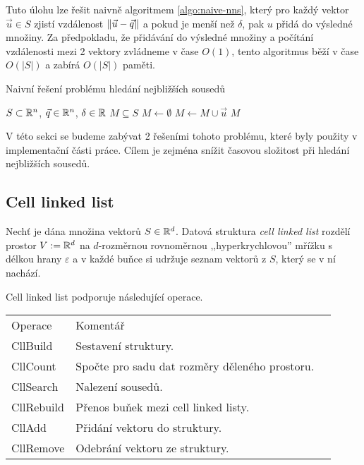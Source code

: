 Tuto úlohu lze řešit naivně algoritmem \ref{algo:naive-nns}, který pro každý vektor $\vec{u} \in S$ zjistí vzdálenost $\|\vec{u} - \vec{q}\|$ a pokud je menší než $\delta$, pak $u$ přidá do výsledné množiny. Za předpokladu, že přidávání do výsledné množiny a počítání vzdálenosti mezi 2 vektory zvládneme v čase $O(1)$, tento algoritmus běží v čase $O(|S|)$ a zabírá $O(|S|)$ paměti.

\begin{algorithm}[ht!]
  \caption{Naivní řešení problému hledání nejbližších sousedů}
  \label{algo:naive-nns}
  \begin{algorithmic}
    \REQUIRE $S \subset \mathbb{R}^n$, $\vec{q} \in \mathbb{R}^n$, $\delta \in \mathbb{R}$
    \ENSURE $M \subseteq S$
    \STATE $M \leftarrow \emptyset$
          \STATE $M \leftarrow M \cup \vec{u}$
        \ENDIF
    \ENDFOR
    \RETURN $M$
  \end{algorithmic}
\end{algorithm}

V této sekci se budeme zabývat 2 řešeními tohoto problému, které byly použity v implementační části práce. Cílem je zejména snížit časovou složitost při hledání nejbližších sousedů.

\subsection{Cell linked list}

\label{defi:cll}
\begin{defi}
  Nechť je dána množina vektorů $S \in \mathbb{R}^d$. Datová struktura \textit{cell linked list} rozdělí prostor $V := \mathbb{R}^d$ na $d$-rozměrnou rovnoměrnou ,,hyperkrychlovou'' mřížku s délkou hrany $\varepsilon$ a v každé buňce si udržuje seznam vektorů z $S$, který se v ní nachází.\cite[s.~149--152]{computer_simulation_of_liquids}
\end{defi}

Cell linked list podporuje následující operace.

\begin{table}[ht!]
  \begin{tabular}{lll}
    Operace & Komentář\\
    CllBuild & Sestavení struktury.\\
    CllCount & Spočte pro sadu dat rozměry děleného prostoru.\\
    CllSearch & Nalezení sousedů.\\
    CllRebuild & Přenos buňek mezi cell linked listy.\\
    CllAdd & Přidání vektoru do struktury.\\
    CllRemove & Odebrání vektoru ze struktury.\\
  \end{tabular}
\end{table}

